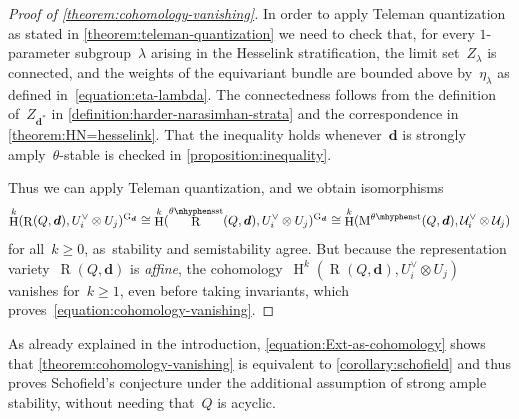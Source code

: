 \documentclass[11pt]{article}
\theoremstyle{plain}
\theoremstyle{definition}
\DeclareMathOperator\HH{H}
\DeclareMathOperator\Rep{R}
\newcommand\group[1][\tuple{d}]{\mathrm{G}_{#1}}
\newcommand\limitset[1][\lambda]{Z_{#1}}
\newcommand\semistable{\ensuremath{\mhyphen\mathrm{sst}}}
\newcommand\stable{\ensuremath{\mhyphen\mathrm{st}}}
\newcommand\tuple[1]{\ensuremath{{\boldsymbol{#1}}}}
\begin{document}
\begin{proof}[Proof of \cref{theorem:cohomology-vanishing}]
In order to apply Teleman quantization
as stated in \cref{theorem:teleman-quantization}
we need to check that,
for every $1$-parameter subgroup~$\lambda$
arising in the Hesselink stratification,
the limit set~$\limitset$ is connected,
and the weights of the equivariant bundle are bounded above by~$\eta_\lambda$ as defined in~\eqref{equation:eta-lambda}.
The connectedness follows from the definition of~$\limitset[{\tuple{d}^*}]$
in \cref{definition:harder-narasimhan-strata}
and the correspondence in \cref{theorem:HN=hesselink}.
That the inequality holds whenever~$\tuple{d}$ is strongly amply~$\theta$-stable
is checked in \cref{proposition:inequality}.

Thus we can apply Teleman quantization,
and we obtain isomorphisms
\begin{equation*}
\HH^k(\Rep(Q,\tuple{d}),U_i^\vee\otimes U_j)^{\group}
\cong
\HH^k(\Rep^{\theta\semistable}(Q,\tuple{d}),U_i^\vee\otimes U_j)^{\group}
\cong
\HH^k(\modulispace[\theta\stable]{Q,\tuple{d}},\mathcal{U}_i^\vee\otimes\mathcal{U}_j)
\end{equation*}
for all~$k\geq 0$, as~stability and semistability agree.
But because the representation variety~$\Rep(Q,\tuple{d})$ is \emph{affine},
the cohomology~$\HH^k(\Rep(Q,\tuple{d}),U_i^\vee\otimes U_j)$ vanishes for~$k\geq 1$,
even before taking invariants,
which proves~\eqref{equation:cohomology-vanishing}.
\end{proof}

As already explained in the introduction,
\eqref{equation:Ext-as-cohomology} shows that \cref{theorem:cohomology-vanishing}
is equivalent to \cref{corollary:schofield}
and thus proves Schofield's conjecture
under the additional assumption of strong ample stability,
without needing that~$Q$ is acyclic.
\end{document}
